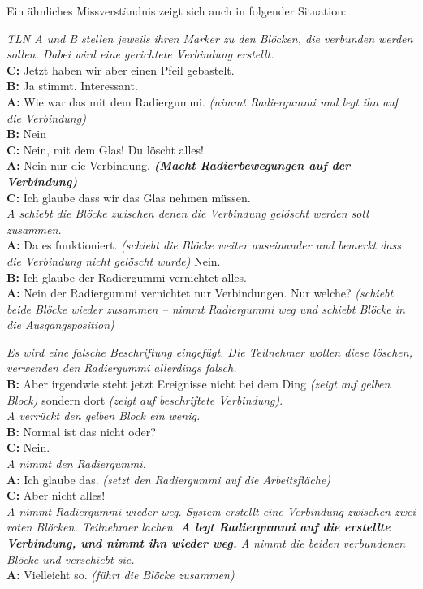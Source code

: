 Ein ähnliches Missverständnis zeigt sich auch in folgender Situation:

\begin{transkript}
	\emph{TLN A und B stellen jeweils ihren Marker zu den Blöcken, die verbunden werden sollen. Dabei wird eine gerichtete Verbindung erstellt.}\\
	\textbf{C:} Jetzt haben wir aber einen Pfeil gebastelt.\\
	\textbf{B:} Ja stimmt. Interessant.\\
	\textbf{A:} Wie war das mit dem Radiergummi. \emph{(nimmt Radiergummi und legt ihn auf die Verbindung)}\\
	\textbf{B:} Nein\\
	\textbf{C:} Nein, mit dem Glas! Du löscht alles!\\
	\textbf{A:} Nein nur die Verbindung. \textbf{\emph{(Macht Radierbewegungen auf der Verbindung)}}\\
	\textbf{C:} Ich glaube dass wir das Glas nehmen müssen.\\
	\emph{A schiebt die Blöcke zwischen denen die Verbindung gelöscht werden soll zusammen.}\\
	\textbf{A:} Da es funktioniert. \emph{(schiebt die Blöcke weiter auseinander und bemerkt dass die Verbindung nicht gelöscht wurde)} Nein.\\
	\textbf{B:} Ich glaube der Radiergummi vernichtet alles.\\
	\textbf{A:} Nein der Radiergummi vernichtet nur Verbindungen. Nur welche? \emph{(schiebt beide Blöcke wieder zusammen – nimmt Radiergummi weg und schiebt Blöcke in die Ausgangsposition)}
\end{transkript}

\begin{transkript}
	\emph{Es wird eine falsche Beschriftung eingefügt. Die Teilnehmer wollen diese löschen, verwenden den Radiergummi allerdings falsch.}\\
	\textbf{B:} Aber irgendwie steht jetzt Ereignisse nicht bei dem Ding \emph{(zeigt auf gelben Block)} sondern dort \emph{(zeigt auf beschriftete Verbindung)}.\\
	\emph{A verrückt den gelben Block ein wenig.}\\
	\textbf{B:} Normal ist das nicht oder?\\
	\textbf{C:} Nein.\\
	\emph{A nimmt den Radiergummi.}\\
	\textbf{A:} Ich glaube das. \emph{(setzt den Radiergummi auf die Arbeitsfläche)}\\
	\textbf{C:} Aber nicht alles!\\
	\emph{A nimmt Radiergummi wieder weg. System erstellt eine Verbindung zwischen zwei roten Blöcken. Teilnehmer lachen. \textbf{A legt Radiergummi auf die erstellte Verbindung, und nimmt ihn wieder weg.} A nimmt die beiden verbundenen Blöcke und verschiebt sie.}\\
	\textbf{A:} Vielleicht so. \emph{(führt die Blöcke zusammen)}
\end{transkript}

